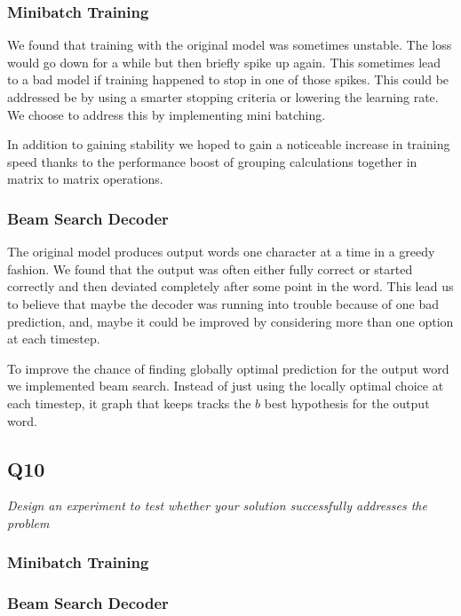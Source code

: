 \documentclass[12pt]{article}
\begin{document}
\subsubsection{Minibatch Training}

We found that training with the original model was sometimes unstable. The loss would go down for a while but then briefly spike up again. This sometimes lead to a bad model if training happened to stop in one of those spikes. This could be addressed be by using a smarter stopping criteria or lowering the learning rate. We choose to address this by implementing mini batching.

In addition to gaining stability we hoped to gain a noticeable increase in training speed thanks to the performance boost of grouping calculations together in matrix to matrix operations.

\subsubsection{Beam Search Decoder}

The original model produces output words one character at a time in a greedy fashion.
We found that the output was often either fully correct or started correctly and then deviated completely after some point in the word. This lead us to believe that maybe the decoder was running into trouble because of one bad prediction, and, maybe it could be improved by considering more than one option at each timestep.

To improve the chance of finding globally optimal prediction for the output word we implemented beam search. Instead of just using the locally optimal choice at each timestep, it graph that keeps tracks the $b$ best hypothesis for the output word.

\subsection{Q10}
\textit{Design an experiment to test whether your solution successfully addresses the problem}

\subsubsection{Minibatch Training}

\subsubsection{Beam Search Decoder}
\end{document}
